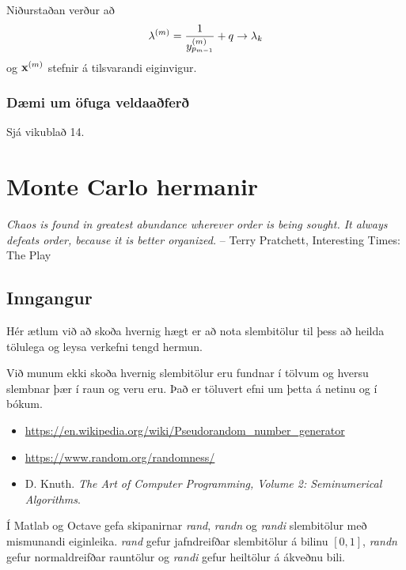 \documentclass[letterpaper,10pt,icelandic]{sphinxmanual}
\begin{document}
Niðurstaðan verður að
\begin{gather}
\begin{split}\lambda^{(m)}=\dfrac 1{y_{p_{m-1}}^{(m)}}+q \to \lambda_k\end{split}\notag
\end{gather}
og \({\mbox{${\bf x}$}}^{(m)}\) stefnir á tilsvarandi eiginvigur.


\subsection{Dæmi um öfuga veldaaðferð}
\label{kafli09:daemi-um-ofuga-veldaafer}
Sjá vikublað 14.


\chapter{Monte Carlo hermanir}
\label{kafli10::doc}\label{kafli10:monte-carlo-hermanir}\label{kafli10:index-8}
\emph{Chaos is found in greatest abundance wherever order is being sought.
It always defeats order, because it is better organized.}
-- Terry Pratchett, Interesting Times: The Play


\section{Inngangur}
\label{kafli10:inngangur}
Hér ætlum við að skoða hvernig hægt er að nota slembitölur til þess að heilda
tölulega og leysa verkefni tengd hermun.

Við munum ekki skoða hvernig slembitölur eru fundnar í tölvum og hversu
slembnar þær í raun og veru eru. Það er töluvert efni um þetta á
netinu og í bókum.
\begin{itemize}
\item {} 
\url{https://en.wikipedia.org/wiki/Pseudorandom\_number\_generator}

\item {} 
\url{https://www.random.org/randomness/}


\item {} D. Knuth. \emph{The Art of Computer Programming, Volume 2: Seminumerical Algorithms}.

\end{itemize}

Í Matlab og Octave gefa skipanirnar  \emph{rand}, \emph{randn} og \emph{randi} slembitölur með mismunandi
eiginleika. \emph{rand} gefur jafndreifðar slembitölur á bilinu \([0,1]\),
\emph{randn} gefur normaldreifðar rauntölur og \emph{randi} gefur heiltölur á ákveðnu bili.
\end{document}
